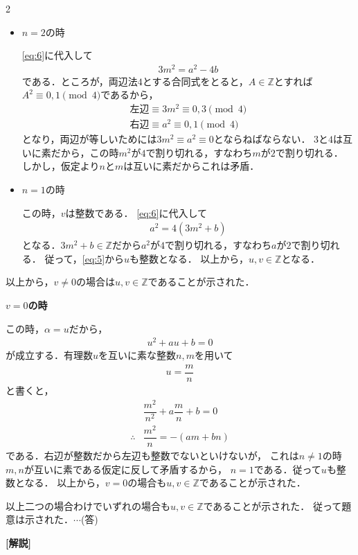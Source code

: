 \documentclass[../../main.tex]{subfiles}
\begin{document}
\begin{multicols}{2}
  \begin{itemize}
    \item[$1^\circ$] $n=2$の時

      \cref{eq:6}に代入して
      \begin{align}
        3m^2 = a^2 - 4b
      \end{align}
      である．ところが，両辺法$4$とする合同式をとると，$A \in \mathbb{Z}$とすれば$A^2 \equiv 0, 1 \pmod{4}$であるから，
      \begin{align}
        \text{左辺} \equiv 3m^2 \equiv 0, 3 \pmod{4} \\
        \text{右辺} \equiv a^2  \equiv 0, 1 \pmod{4}
      \end{align}
      となり，両辺が等しいためには$3m^2\equiv a^2 \equiv 0$とならねばならない．
      $3$と$4$は互いに素だから，この時$m^2$が$4$で割り切れる，すなわち$m$が$2$で割り切れる．
      しかし，仮定より$n$と$m$は互いに素だからこれは矛盾．

    \item[$2^\circ$] $n=1$の時

      この時，$v$は整数である．
      \cref{eq:6}に代入して
      \begin{align}
        a^2 = 4(3m^2 + b)
      \end{align}
      となる．$3m^2 + b \in\mathbb{Z}$だから$a^2$が$4$で割り切れる，すなわち$a$が$2$で割り切れる．
      従って，\cref{eq:5}から$u$も整数となる．
      以上から，$u,v \in\mathbb{Z}$となる．
  \end{itemize}

  以上から，$v\neq 0$の場合は$u,v\in\mathbb{Z}$であることが示された．

  \textbf{$v =  0$の時}

  この時，$\alpha = u$だから，
  \begin{align}
    u^2+au+b=0
  \end{align}
  が成立する．有理数$u$を互いに素な整数$n,m$を用いて
  \begin{align}
    u = \dfrac{m}{n}
  \end{align}
  と書くと，
  \begin{align}
    & \dfrac{m^2}{n^2}+a\dfrac{m}{n}+b=0 \\
    \therefore
    & \dfrac{m^2}{n} = -(am+bn)
  \end{align}
  である．右辺が整数だから左辺も整数でないといけないが，
  これは$n\neq 1$の時$m,n$が互いに素である仮定に反して矛盾するから，
  $n=1$である．従って$u$も整数となる．
  以上から，$v = 0$の場合も$u,v\in\mathbb{Z}$であることが示された．

  以上二つの場合わけでいずれの場合も$u,v\in\mathbb{Z}$であることが示された．
  従って題意は示された．$\cdots$(答)

  {\bf [解説]}

  \newpage
\end{multicols}
\end{document}
